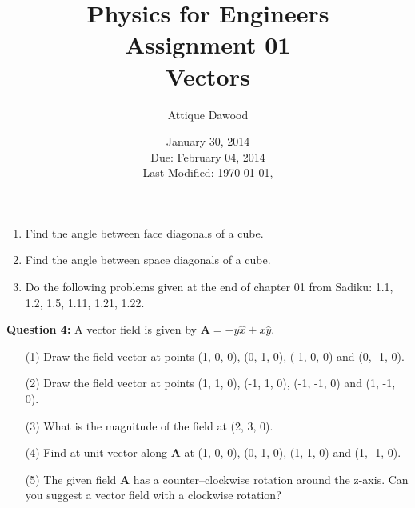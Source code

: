 \documentclass[12pt,a4paper]{article}
\title{\vspace{-2cm}Physics for Engineers\\Assignment 01\\Vectors}
\author{Attique Dawood}
\date{January 30, 2014\\Due: February 04, 2014\\[0.2cm] Last Modified: \today, \currenttime}
\begin{document}
\maketitle
\begin{enumerate}
\item Find the angle between face diagonals of a cube.
\item Find the angle between space diagonals of a cube.
\item Do the following problems given at the end of chapter 01 from Sadiku: 1.1, 1.2, 1.5, 1.11, 1.21, 1.22.
\end{enumerate}
\noindent\textbf{Question 4:} A vector field is given by $\textbf{A}=-y\hat x+x\hat y$.
\begin{enumerate}
\item[(1)] Draw the field vector at points (1, 0, 0), (0, 1, 0), (-1, 0, 0) and (0, -1, 0).
\item[(2)] Draw the field vector at points (1, 1, 0), (-1, 1, 0), (-1, -1, 0) and (1, -1, 0).
\item[(3)] What is the magnitude of the field at (2, 3, 0).
\item[(4)] Find at unit vector along \textbf{A} at (1, 0, 0), (0, 1, 0), (1, 1, 0) and (1, -1, 0).
\item[(5)] The given field \textbf{A} has a counter--clockwise rotation around the z-axis. Can you suggest a vector field with a clockwise rotation?
\end{enumerate}
\end{document}
